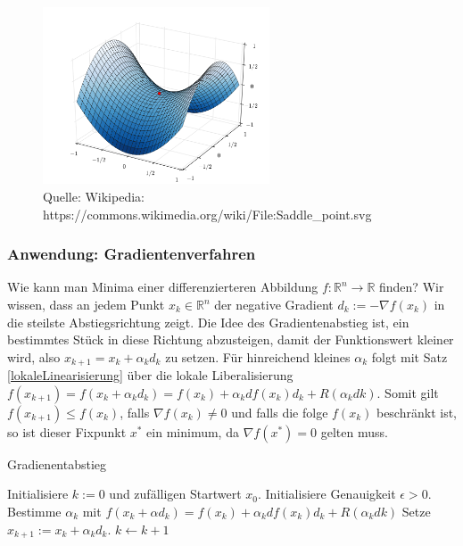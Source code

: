 \begin{figure}[H]
      \centering
    \includegraphics[width=0.6\textwidth]{images/Saddle_point}
      \caption{Quelle: Wikipedia: https://commons.wikimedia.org/wiki/File:Saddle\_point.svg}

\end{figure}



\subsubsection*{Anwendung: Gradientenverfahren} 
Wie kann man Minima einer  differenzierteren Abbildung $f: \mathbb{R}^n \to \mathbb{R}$ finden? 
Wir wissen, dass an jedem Punkt $x_k \in  \mathbb{R}^n$ der negative Gradient  $d_k := -\nabla f (x_k)$ in die steilste Abstiegsrichtung zeigt.
Die Idee des Gradientenabstieg ist, ein bestimmtes  Stück in diese Richtung abzusteigen, damit der Funktionswert kleiner wird, also $x_{k+1} = x_k + \alpha_k d_k$ zu setzen. Für hinreichend kleines $\alpha_k$ folgt mit Satz \ref{lokaleLinearisierung} über die lokale Liberalisierung  
$f(x_{k+1}) = f (x_k + \alpha_k d_k) =  f(x_k) + \alpha_k df(x_k)d_k + R( \alpha_k dk)$.  Somit gilt $f(x_{k+1}) \leq f(x_k)$, falls $\nabla f(x_k) \neq 0$ und falls die folge $f(x_k)$ beschränkt ist, so ist  dieser Fixpunkt $x^*$ ein minimum, da $\nabla f(x^*) = 0$ gelten muss.  

\begin{algorithm}
\caption{Gradienentabstieg}
\begin{algorithmic}[1]


    \State Initialisiere $k:=0$ und zufälligen Startwert $x_0$.
\State Initialisiere Genauigkeit $\epsilon > 0$.
      
        \State Bestimme $\alpha_k$  mit $f (x_k + \alpha d_k) =  f(x_k) + \alpha_k df(x_k)d_k + R( \alpha_k dk)$ 
        \State Setze $x_{k+1} := x_k  + \alpha_k d_k$. 
 	\State  $k \leftarrow k+1$ 
    \EndWhile  \label{Gradientenverfahren}


\end{algorithmic}
\end{algorithm}

